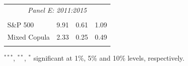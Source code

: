 \documentclass[pdf,10pt,xcolor=dvipsnames,hide notes]{beamer}
\begin{document}
\begin{frame}
\begin{threeparttable}[H]
\begin{tabularx}{\textwidth}{@{\extracolsep{\fill}}llll@{}}
	\multicolumn{4}{c}{\textit{Panel E: 2011:2015}} \\
	&       &       &       \\
	S\&P 500 & 9.91  & 0.61  & 1.09 \\
	Mixed Copula & 2.33  & 0.25  & 0.49 \\
	\multicolumn{1}{r}{} & \multicolumn{1}{r}{} & \multicolumn{1}{r}{} & \multicolumn{1}{r}{} \\
	\bottomrule
\end{tabularx}%
\begin{tablenotes}
	\item \scriptsize $^{\ast\ast\ast}$, $^{\ast\ast}$, $^{\ast}$  significant at 1\%, 5\% and 10\% levels, respectively.
\end{tablenotes}
\label{tab:table109}%
\end{threeparttable}%

\end{frame}
\end{document}
